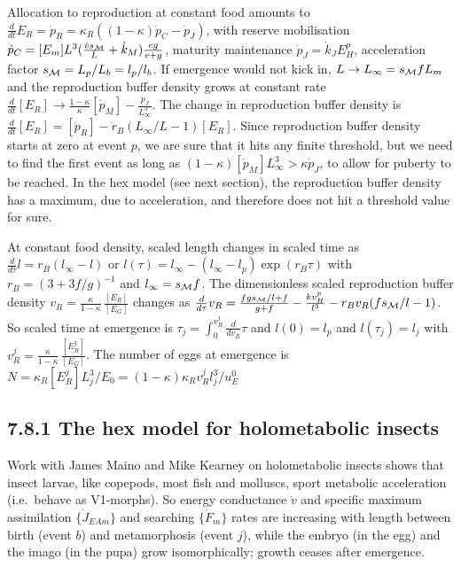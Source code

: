 Allocation to reproduction at constant food amounts to $\frac{d} {dt} E_R = \dot{p}_R = \kappa_R \left( (1 - \kappa) \dot{p}_C  - \dot{p}_J \right)$, with reserve mobilisation $\dot{p}_C = [E_m] L^3 (\frac{\dot{v} s_{\cal M}} {L} + \dot{k}_M) \frac{e g} {e + g}$, maturity maintenance $\dot{p}_J = \dot{k}_J E_H^p$, acceleration factor $s_{\cal M} = L_p/ L_b = l_p/ l_b$.
If emergence would not kick in, $L \rightarrow L_\infty = s_{\cal M} f L_m$ and the reproduction buffer density grows at constant rate $\frac{d} {dt} [E_R] \rightarrow \frac{1 - \kappa} {\kappa} [\dot{p}_M] - \frac{\dot{p}_J} {L_\infty^3}$. 
The change in reproduction buffer density is $\frac{d} {dt} [E_R] = [\dot{p}_R] - \dot{r}_B (L_\infty/ L - 1) [E_R]$.
Since reproduction buffer density starts at zero at event $p$, we are sure that it hits any finite threshold, but we need to find the first event as long as $(1 - \kappa) [\dot{p}_M] L_\infty^3 > \kappa \dot{p}_J$, to allow for puberty to be reached.
In the hex model (see next section), the reproduction buffer density has a maximum, due to acceleration, and therefore does not hit a threshold value for sure.

At constant food density, scaled length changes in scaled time as $\frac{d} {d \tau} l = r_B(l_\infty - l)$ or $l(\tau) = l_\infty - (l_\infty - l_p) \exp(r_B \tau)$ with $r_B = (3 + 3 f/g)^{-1}$ and $l_\infty = s_{\cal M} f$.
The dimensionless scaled reproduction buffer density $v_R = \frac{\kappa} {1 - \kappa} \, \frac{[E_R]} {[E_G]}$ changes as 
$\frac{d} {d \tau} v_R = \frac{f g s_{\cal M}/ l + f} {g + f} - \frac{k v_H^p} {l^3} - r_B v_R (f s_{\cal M} / l - 1)$.
So scaled time at emergence is $\tau_j = \int_0^{v_R^j} \frac{d} {d v_R} \tau$ and $l(0) = l_p$ and $l(\tau_j) = l_j$ with  $v_R^j = \frac{\kappa} {1 - \kappa} \, \frac{[E_R^j]} {[E_G]}$. 
The number of eggs at emergence is $N = \kappa_R [E_R^j] L_j^3/ E_0 = (1 - \kappa) \kappa_R v_R^j l_j^3/ u_E^0$

\subsection*{7.8.1 The hex model for holometabolic insects}
{}
\label{ssec_c:pupa}

Work with James Maino and Mike Kearney on holometabolic insects shows that insect larvae, like copepods, most fish and molluscs, sport metabolic acceleration \cite{KooyPecq2011,Kooy2014} (i.e.\ behave as V1-morphs).
So energy conductance $\dot{v}$ and specific maximum assimilation $\{\dot{J}_{EAm}\}$ and searching $\{\dot{F}_m\}$ rates  are increasing with length between birth (event $b$) and metamorphosis (event $j$), while the embryo (in the egg) and the imago (in the pupa) grow isomorphically;
growth ceases after emergence.


